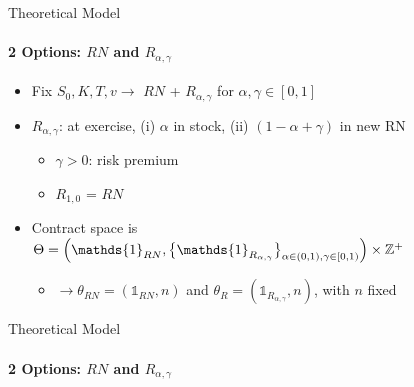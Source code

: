 \documentclass{beamer}
\begin{document}
\begin{frame}{Theoretical Model}
    \framesubtitle{2 Options: $RN$ and $R_{\alpha, \gamma}$}
    \begin{itemize}
        \item Fix $S_0, K, T, v \rightarrow$ $RN$ + $R_{\alpha, \gamma}$ for $\alpha, \gamma \in [0,1]$ 
        \item $R_{\alpha, \gamma}$: at exercise, (i) $\alpha$ in stock, (ii) $(1 - \alpha + \gamma)$ in new RN
        \begin{itemize}
            \item $\gamma > 0$: risk premium
            \item $R_{1,0}$ = $RN$
        \end{itemize}
        \item Contract space is $\Theta = \Bigl( \mathds{1}_{RN}, \bigl\{ \mathds{1}_{R_{\alpha, \gamma}} \bigr\}_{\alpha \in (0,1), \gamma \in [0, 1)} \Bigr) \times \mathbb{Z}^+ $
        \begin{itemize}
            \item $\rightarrow \theta_{RN} = (\mathds{1}_{RN}, n)$ and $\theta_{R} = (\mathds{1}_{R_{\alpha, \gamma}}, n)$, with $n$ fixed
        \end{itemize}
    \end{itemize}
\end{frame}

\begin{frame}{Theoretical Model}
    \framesubtitle{2 Options: $RN$ and $R_{\alpha, \gamma}$}


\end{frame}
\end{document}
